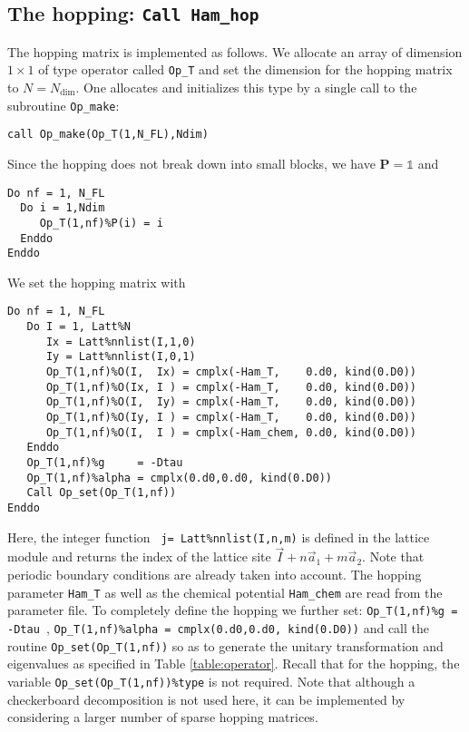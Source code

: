\subsection{The hopping: \texttt{Call Ham\_hop}}

The hopping matrix is implemented as follows. 
We allocate an array of dimension $1\times 1$ of type operator  called \texttt{Op\_T} and set the  dimension for the hopping  matrix to $N=N_{\mathrm{dim}}$. One  allocates and initializes this type by a single call to the subroutine \texttt{Op\_make}: 
\begin{lstlisting}[style=fortran]
call Op_make(Op_T(1,N_FL),Ndim)
\end{lstlisting}
Since the hopping  does not  break down into small blocks, we have ${\bm P}=\mathds{1}$   and  
\begin{lstlisting}[style=fortran]
Do nf = 1, N_FL
  Do i = 1,Ndim
     Op_T(1,nf)%P(i) = i
  Enddo
Enddo
\end{lstlisting}
We set the hopping matrix  with 
\begin{lstlisting}[style=fortran]
Do nf = 1, N_FL
   Do I = 1, Latt%N
      Ix = Latt%nnlist(I,1,0)
      Iy = Latt%nnlist(I,0,1)
      Op_T(1,nf)%O(I,  Ix) = cmplx(-Ham_T,    0.d0, kind(0.D0))
      Op_T(1,nf)%O(Ix, I ) = cmplx(-Ham_T,    0.d0, kind(0.D0))
      Op_T(1,nf)%O(I,  Iy) = cmplx(-Ham_T,    0.d0, kind(0.D0))
      Op_T(1,nf)%O(Iy, I ) = cmplx(-Ham_T,    0.d0, kind(0.D0))
      Op_T(1,nf)%O(I,  I ) = cmplx(-Ham_chem, 0.d0, kind(0.D0))
   Enddo
   Op_T(1,nf)%g     = -Dtau
   Op_T(1,nf)%alpha = cmplx(0.d0,0.d0, kind(0.D0))
   Call Op_set(Op_T(1,nf))
Enddo
\end{lstlisting}
Here, the integer function \texttt{  j=  Latt\%nnlist(I,n,m)} is defined in the lattice module and returns the index of the lattice site $ \vec{I} +  n \vec{a}_1 +  m \vec{a}_2$.
Note that periodic boundary conditions are 
already taken into account.  The hopping parameter \texttt{Ham\_T} as well as the chemical potential \texttt{Ham\_chem} are read from the parameter file.  
To completely define the hopping  we further set: \texttt{Op\_T(1,nf)\%g = -Dtau }, \texttt{Op\_T(1,nf)\%alpha = cmplx(0.d0,0.d0, kind(0.D0))} and call the routine  \texttt{Op\_set(Op\_T(1,nf))}  so as to generate  the unitary transformation and eigenvalues as specified in Table \ref{table:operator}.  Recall that for the hopping, the variable  \texttt{Op\_set(Op\_T(1,nf))\%type}  is not  required. 
Note that although a checkerboard decomposition is not  used here,  it can be implemented by considering a larger number of sparse hopping matrices.  


